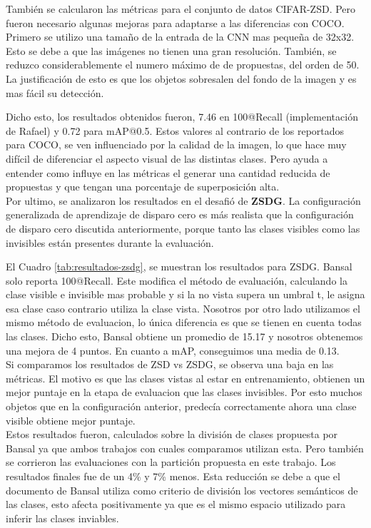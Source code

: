 También se calcularon las métricas para el conjunto de datos CIFAR-ZSD. Pero fueron necesario algunas mejoras para adaptarse a las diferencias con COCO. Primero se utilizo una tamaño de la entrada de la CNN mas pequeña de 32x32. Esto se debe a que las imágenes no tienen una gran resolución. También, se reduzco considerablemente el numero máximo de de propuestas, del orden de 50. La justificación de esto es que los objetos sobresalen del fondo de la imagen y es mas fácil su detección.

Dicho esto, los resultados obtenidos fueron, 7.46 en 100@Recall (implementación de Rafael) y 0.72 para mAP@0.5. Estos valores al contrario de los reportados para COCO, se ven influenciado por la calidad de la imagen, lo que hace muy difícil de diferenciar el aspecto visual de las distintas clases. Pero ayuda a entender como influye en las métricas el generar una cantidad reducida de propuestas y que tengan una porcentaje de superposición alta.\\

Por ultimo, se analizaron los resultados en el desafió de \textbf{ZSDG}. La configuración generalizada de aprendizaje de disparo cero es más realista que la configuración de disparo cero discutida anteriormente, porque tanto las clases visibles como las invisibles están presentes durante la evaluación.

El Cuadro \ref{tab:resultados-zsdg}, se muestran los resultados para ZSDG. Bansal solo reporta 100@Recall. Este modifica el método de evaluación, calculando la clase visible e invisible mas probable y si la no vista supera un umbral t, le asigna esa clase caso contrario utiliza la clase vista. Nosotros por otro lado utilizamos el mismo método de evaluacion, lo única diferencia es que se tienen en cuenta todas las clases. Dicho esto, Bansal obtiene un promedio de 15.17 y nosotros obtenemos una mejora de 4 puntos. En cuanto a mAP, conseguimos una media de 0.13.\\

Si comparamos los resultados de ZSD vs ZSDG, se observa una baja en las métricas. El motivo es que las clases vistas al estar en entrenamiento, obtienen un mejor puntaje en la etapa de evaluacion que las clases invisibles. Por esto muchos objetos que en la configuración anterior, predecía correctamente ahora una clase visible obtiene mejor puntaje.\\

Estos resultados fueron, calculados sobre la división de clases propuesta por Bansal ya que ambos trabajos con cuales comparamos utilizan esta. Pero también se corrieron las evaluaciones con la partición propuesta en este trabajo. Los resultados finales fue de un 4\% y 7\% menos. Esta reducción se debe a que el documento de Bansal utiliza como criterio de división los vectores semánticos de las clases, esto afecta positivamente ya que es el mismo espacio utilizado para inferir las clases inviables.

